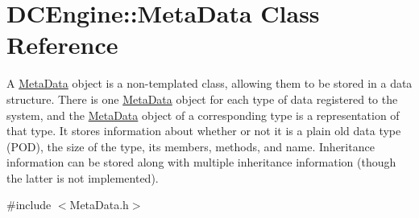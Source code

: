 \hypertarget{classDCEngine_1_1MetaData}{\section{D\-C\-Engine\-:\-:Meta\-Data Class Reference}
\label{classDCEngine_1_1MetaData}
}


A \hyperlink{classDCEngine_1_1MetaData}{Meta\-Data} object is a non-\/templated class, allowing them to be stored in a data structure. There is one \hyperlink{classDCEngine_1_1MetaData}{Meta\-Data} object for each type of data registered to the system, and the \hyperlink{classDCEngine_1_1MetaData}{Meta\-Data} object of a corresponding type is a representation of that type. It stores information about whether or not it is a plain old data type (P\-O\-D), the size of the type, its members, methods, and name. Inheritance information can be stored along with multiple inheritance information (though the latter is not implemented).  




{\ttfamily \#include $<$Meta\-Data.\-h$>$}

